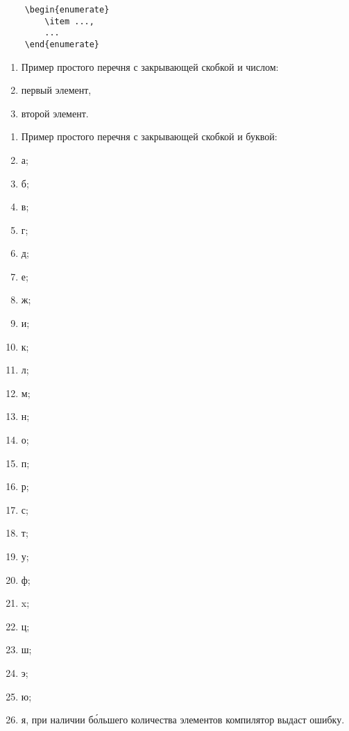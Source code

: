 \documentclass[14pt, a4paper, titlepage]{extarticle}
\begin{document}
\subsubsection{}

\begin{verbatim}
	\begin{enumerate}
		\item ...,
		...
	\end{enumerate} 
\end{verbatim}

\begin{enumerate}
	\item[] Пример простого перечня с закрывающей скобкой и числом:
	\item первый элемент,
	\item второй элемент.
\end{enumerate}

\begin{enumerate}[label=\asbuk*), ref=\asbuk*]
	\item[] Пример простого перечня с закрывающей скобкой и буквой:
	\item а;
	\item б;
	\item в;
	\item г;
	\item д;
	\item е;
	\item ж;
	\item и;
	\item к;
	\item л;
	\item м;
	\item н;
	\item о;
	\item п;
	\item р;
	\item с;
	\item т;
	\item у;
	\item ф;
	\item x;
	\item ц;
	\item ш;
	\item э;
	\item ю;
	\item я, при наличии б\'ольшего количества элементов компилятор выдаст ошибку.
\end{enumerate}

\subsubsection{}
\end{document}
